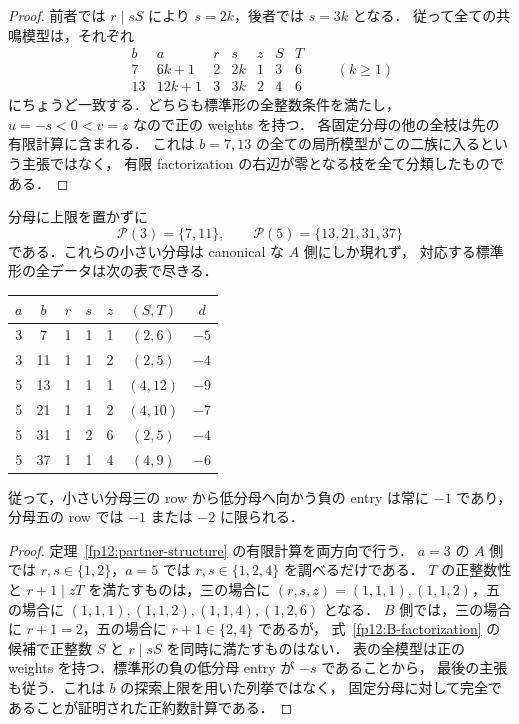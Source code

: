 \begin{proof}
前者では $r\mid sS$ により $s=2k$，後者では $s=3k$ となる．
従って全ての共鳴模型は，それぞれ
\[
 \begin{array}{c|cccccc}
  b&a&r&s&z&S&T\\\hline
  7&6k+1&2&2k&1&3&6\\
  13&12k+1&3&3k&2&4&6
 \end{array}\qquad(k\geq1)
\]
にちょうど一致する．どちらも標準形の全整数条件を満たし，
$u=-s<0<v=z$ なので正の weights を持つ．
各固定分母の他の全枝は先の有限計算に含まれる．
これは $b=7,13$ の全ての局所模型がこの二族に入るという主張ではなく，
有限 factorization の右辺が零となる枝を全て分類したものである．
\end{proof}

\begin{proposition}
\label{fp12:small-partners}
分母に上限を置かずに
\[
 \mathcal P(3)=\{7,11\},\qquad
 \mathcal P(5)=\{13,21,31,37\}
\]
である．これらの小さい分母は canonical な $A$ 側にしか現れず，
対応する標準形の全データは次の表で尽きる．
\begin{center}
\small
\begin{tabular}{ccccccc}
 $a$&$b$&$r$&$s$&$z$&$(S,T)$&$d$\\\hline
 3&7&1&1&1&$(2,6)$&$-5$\\
 3&11&1&1&2&$(2,5)$&$-4$\\
 5&13&1&1&1&$(4,12)$&$-9$\\
 5&21&1&1&2&$(4,10)$&$-7$\\
 5&31&1&2&6&$(2,5)$&$-4$\\
 5&37&1&1&4&$(4,9)$&$-6$
\end{tabular}
\end{center}
従って，小さい分母三の row から低分母へ向かう負の entry は常に $-1$ であり，
分母五の row では $-1$ または $-2$ に限られる．
\end{proposition}

\begin{proof}
定理~\ref{fp12:partner-structure} の有限計算を両方向で行う．
$a=3$ の $A$ 側では $r,s\in\{1,2\}$，$a=5$ では $r,s\in\{1,2,4\}$ を調べるだけである．
$T$ の正整数性と $r+1\mid zT$ を満たすものは，三の場合に
$(r,s,z)=(1,1,1),(1,1,2)$，五の場合に
$(1,1,1),(1,1,2),(1,1,4),(1,2,6)$ となる．
$B$ 側では，三の場合に $r+1=2$，五の場合に $r+1\in\{2,4\}$ であるが，
式~\eqref{fp12:B-factorization} の候補で正整数 $S$ と $r\mid sS$ を同時に満たすものはない．
表の全模型は正の weights を持つ．標準形の負の低分母 entry が $-s$ であることから，
最後の主張も従う．これは $b$ の探索上限を用いた列挙ではなく，
固定分母に対して完全であることが証明された正約数計算である．
\end{proof}
